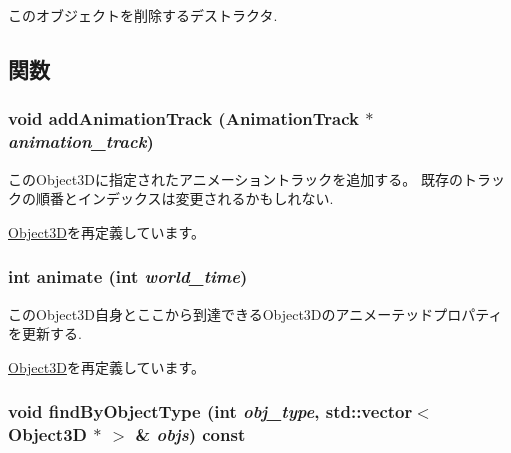 このオブジェクトを削除するデストラクタ. 

\subsection{関数}
\hypertarget{classm3g_1_1VertexBuffer_415c0b110f95410ded9b85e5d99a496b}{
\subsubsection[{addAnimationTrack}]{\setlength{\rightskip}{0pt plus 5cm}void addAnimationTrack ({\bf AnimationTrack} $\ast$ {\em animation\_\-track})}}
\label{classm3g_1_1VertexBuffer_415c0b110f95410ded9b85e5d99a496b}


このObject3Dに指定されたアニメーショントラックを追加する。 既存のトラックの順番とインデックスは変更されるかもしれない. 

\hyperlink{classm3g_1_1Object3D_415c0b110f95410ded9b85e5d99a496b}{Object3D}を再定義しています。\hypertarget{classm3g_1_1VertexBuffer_82cfeb67ca66b93e2ca7bda9a4f0e2aa}{
\subsubsection[{animate}]{\setlength{\rightskip}{0pt plus 5cm}int animate (int {\em world\_\-time})}}
\label{classm3g_1_1VertexBuffer_82cfeb67ca66b93e2ca7bda9a4f0e2aa}


このObject3D自身とここから到達できるObject3Dのアニメーテッドプロパティを更新する. 

\hyperlink{classm3g_1_1Object3D_8aad1ceab4c2a03609c8a42324ce484d}{Object3D}を再定義しています。\hypertarget{classm3g_1_1VertexBuffer_4dadb21b568b0230fac106f15040138c}{
\subsubsection[{findByObjectType}]{\setlength{\rightskip}{0pt plus 5cm}void findByObjectType (int {\em obj\_\-type}, \/  std::vector$<$ {\bf Object3D} $\ast$ $>$ \& {\em objs}) const}}
\label{classm3g_1_1VertexBuffer_4dadb21b568b0230fac106f15040138c}


